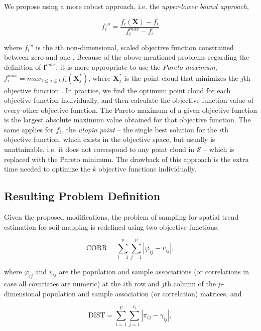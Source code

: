 We propose using a more robust approach, i.e. the \emph{upper-lower bound approach},

\begin{equation}
 f_i'' = \frac{f_i(\boldsymbol{X}) - f_i^{\circ}}{f_i^{max} - f_i^{\circ}}
\end{equation}

\noindent where $f_i''$ is the $i$th non-dimensional, scaled objective function constrained between zero 
and one \cite{MarlerEtAl2005}. Because of the above-mentioned problems regarding the definition of 
$\boldsymbol{f}^{max}$, it is more appropriate to use the \emph{Pareto maximum}, $f_i^{max} = max_{1 \leq j 
\leq k} f_ i(\boldsymbol{X}_j^*)$, where $\boldsymbol{X}_j^*$ is the point cloud that minimizes the $j$th 
objective function \cite{MarlerEtAl2005}. In practice, we find the optimum point cloud for each objective 
function individually, and then calculate the objective function value of every other objective function. The 
Pareto maximum of a given objective function is the largest absolute maximum value obtained for that objective 
function. The same applies for $f_i^{\circ}$, the \emph{utopia point} -- the single best solution for the 
$i$th objective function, which exists in the objective space, but usually is unattainable, i.e. it does not 
correspond to any point cloud in $\mathcal{S}$ \cite{Arora2011} -- which is replaced with the Pareto 
minimum. The drawback of this approach is the extra time needed to optimize the $k$ objective functions 
individually.

\subsection{Resulting Problem Definition}

Given the proposed modifications, the problem of sampling for spatial trend estimation for soil mapping is 
redefined using two objective functions,

\begin{equation}
 \text{CORR} = \sum_{i=1}^{p}\sum_{j=1}^{p}|\varphi_{ij} - v_{ij}|,
\end{equation}\label{eq:chap08-corr}

\noindent where $\varphi_{ij}$ and $v_{ij}$ are the population and sample associations (or correlations in 
case all covariates are numeric) at the $i$th row and $j$th column of the $p$-dimensional population and 
sample association (or correlation) matrices, and

\begin{equation}
 \text{DIST} = \sum_{i=1}^{p}\sum_{j=1}^{c_i} |\pi_{ij} - \gamma_{ij}|,
\end{equation}\label{eq:chap08-dist}

